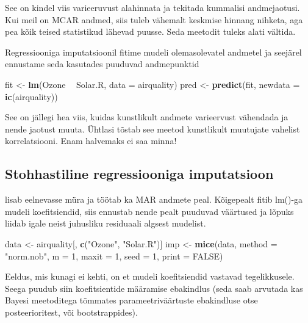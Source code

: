 \documentclass[]{book}
\newenvironment{Shaded}{\begin{snugshade}}{\end{snugshade}}
\newcommand{\KeywordTok}[1]{\textcolor[rgb]{0.13,0.29,0.53}{\textbf{#1}}}
\newcommand{\DataTypeTok}[1]{\textcolor[rgb]{0.13,0.29,0.53}{#1}}
\newcommand{\DecValTok}[1]{\textcolor[rgb]{0.00,0.00,0.81}{#1}}
\newcommand{\StringTok}[1]{\textcolor[rgb]{0.31,0.60,0.02}{#1}}
\newcommand{\OtherTok}[1]{\textcolor[rgb]{0.56,0.35,0.01}{#1}}
\newcommand{\OperatorTok}[1]{\textcolor[rgb]{0.81,0.36,0.00}{\textbf{#1}}}
\newcommand{\NormalTok}[1]{#1}
\begin{document}
See on kindel viis varieeruvust alahinnata ja tekitada kummalisi
andmejaotusi. Kui meil on MCAR andmed, siis tuleb vähemalt keskmise
hinnang nihketa, aga pea kõik teised statistikud lähevad puusse. Seda
meetodit tuleks alati vältida.

Regressiooniga imputatsioonil fitime mudeli olemasolevatel andmetel ja
seejärel ennustame seda kasutades puuduvad andmepunktid

\begin{Shaded}
\begin{Highlighting}[]
\NormalTok{fit <-}\StringTok{ }\KeywordTok{lm}\NormalTok{(Ozone }\OperatorTok{~}\StringTok{ }\NormalTok{Solar.R, }\DataTypeTok{data =}\NormalTok{ airquality)}
\NormalTok{pred <-}\StringTok{ }\KeywordTok{predict}\NormalTok{(fit, }\DataTypeTok{newdata =} \KeywordTok{ic}\NormalTok{(airquality))}
\end{Highlighting}
\end{Shaded}

See on jällegi hea viis, kuidas kunstlikult andmete varieervust
vähendada ja nende jaotust muuta. Ühtlasi tõstab see meetod kunstlikult
muutujate vahelist korrelatsiooni. Enam halvemaks ei saa minna!

\subsection{Stohhastiline regressiooniga
imputatsioon}\label{stohhastiline-regressiooniga-imputatsioon}

lisab eelnevasse müra ja töötab ka MAR andmete peal. Kõigepealt fitib
lm()-ga mudeli koefitsiendid, siis ennustab nende pealt puuduvad
väärtused ja lõpuks liidab igale neist juhusliku residuaali algsest
mudelist.

\begin{Shaded}
\begin{Highlighting}[]
\NormalTok{data <-}\StringTok{ }\NormalTok{airquality[, }\KeywordTok{c}\NormalTok{(}\StringTok{"Ozone"}\NormalTok{, }\StringTok{"Solar.R"}\NormalTok{)]}
\NormalTok{imp <-}\StringTok{ }\KeywordTok{mice}\NormalTok{(data, }\DataTypeTok{method =} \StringTok{"norm.nob"}\NormalTok{, }\DataTypeTok{m =} \DecValTok{1}\NormalTok{, }\DataTypeTok{maxit =} \DecValTok{1}\NormalTok{,}
            \DataTypeTok{seed =} \DecValTok{1}\NormalTok{, }\DataTypeTok{print =} \OtherTok{FALSE}\NormalTok{)}
\end{Highlighting}
\end{Shaded}

Eeldus, mis kunagi ei kehti, on et mudeli koefitsiendid vastavad
tegelikkusele. Seega puudub siin koefitsientide määramise ebakindlus
(seda saab arvutada kas Bayesi meetoditega tõmmates parameetriväärtuste
ebakindluse otse posteerioritest, või bootstrappides).
\end{document}
